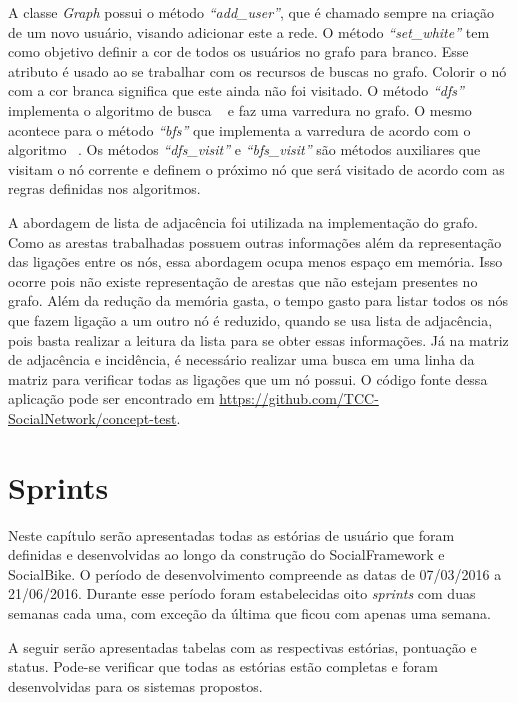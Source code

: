 \begin{apendicesenv}
A classe \textit{Graph} possui o método \textit{``add\_user''}, que é chamado sempre na criação de um novo usuário, visando adicionar este a rede. O método \textit{``set\_white''} tem como objetivo definir a cor de todos os usuários no grafo para branco. Esse atributo é usado ao se trabalhar com os recursos de buscas no grafo. Colorir o nó com a cor branca significa que este ainda não foi visitado. O método \textit{``dfs''} implementa o algoritmo de busca ~ e faz uma varredura no grafo. O mesmo acontece para o método \textit{``bfs''} que implementa a varredura de acordo com o algoritmo ~. Os métodos \textit{``dfs\_visit''} e \textit{``bfs\_visit''} são métodos auxiliares que visitam o nó corrente e definem o próximo nó que será visitado de acordo com as regras definidas nos algoritmos.

A abordagem de lista de adjacência foi utilizada na implementação do grafo. Como as arestas trabalhadas possuem outras informações além da representação das ligações entre os nós, essa abordagem ocupa menos espaço em memória. Isso ocorre pois não existe representação de arestas que não estejam presentes no grafo. Além da redução da memória gasta, o tempo gasto para listar todos os nós que fazem ligação a um outro nó é reduzido, quando se usa lista de adjacência, pois basta realizar a leitura da lista para se obter essas informações. Já na matriz de adjacência e incidência, é necessário realizar uma busca em uma linha da matriz para verificar todas as ligações que um nó possui. O código fonte dessa aplicação pode ser encontrado em \url{https://github.com/TCC-SocialNetwork/concept-test}.

\chapter{Sprints}
\label{chap:sprints}

Neste capítulo serão apresentadas todas as estórias de usuário que foram definidas e desenvolvidas ao longo da construção do SocialFramework e SocialBike. O período de desenvolvimento compreende as datas de 07/03/2016 a 21/06/2016. Durante esse período foram estabelecidas oito \textit{sprints} com duas semanas cada uma, com exceção da última que ficou com apenas uma semana.

A seguir serão apresentadas tabelas com as respectivas estórias, pontuação e status. Pode-se verificar que todas as estórias estão completas e foram desenvolvidas para os sistemas propostos.


\end{apendicesenv}
